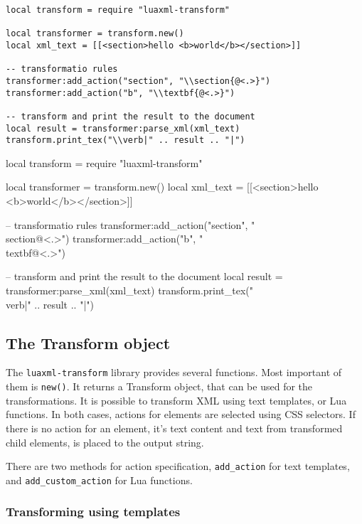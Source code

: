 \documentclass{ltxdoc}
\begin{document}
\begin{verbatim}
local transform = require "luaxml-transform"

local transformer = transform.new()
local xml_text = [[<section>hello <b>world</b></section>]]

-- transformatio rules
transformer:add_action("section", "\\section{@<.>}")
transformer:add_action("b", "\\textbf{@<.>}")

-- transform and print the result to the document
local result = transformer:parse_xml(xml_text)
transform.print_tex("\\verb|" .. result .. "|")
\end{verbatim}
\begin{framed}
\begin{luacode*}
local transform = require "luaxml-transform"

local transformer = transform.new()
local xml_text = [[<section>hello <b>world</b></section>]]

-- transformatio rules
transformer:add_action("section", "\\section{@<.>}")
transformer:add_action("b", "\\textbf{@<.>}")

-- transform and print the result to the document
local result = transformer:parse_xml(xml_text)
transform.print_tex("\\verb|" .. result .. "|")
\end{luacode*}
\end{framed}

\subsection{The Transform object }

The \texttt{luaxml-transform} library provides several functions. 
Most important of them is \verb|new()|. It returns a Transform object,
that can be used for the transformations. It is possible to transform 
XML using text templates, or Lua functions. In both cases, actions for
elements are selected using CSS selectors. If there is no action for 
an element, it's text content and text from transformed child elements,
is placed to the output string.

There are two methods for action specification, \verb|add_action| for 
text templates, and \verb|add_custom_action| for Lua functions.

\subsubsection{Transforming using templates}
\end{document}
